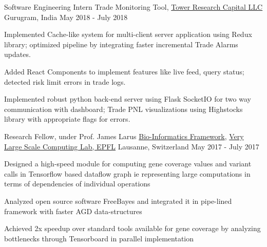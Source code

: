 

\begin{cventries}

  \cventry
    {Software Engineering Intern} %
    {Trade Monitoring Tool, \href{https://www.tower-research.com/}{Tower Research Capital LLC}} %
    {Gurugram, India} %
    {May 2018 - July 2018} %
    {
      \begin{cvitems} %
        \item {Implemented Cache-like system for multi-client server application using Redux library; optimized pipeline by integrating faster incremental Trade Alarms updates.}
        \item {Added React Components to implement features like live feed, query status; detected risk limit errors in trade logs.}
        \item {Implemented robust python back-end server using Flask SocketIO for two way communication with dashboard; Trade PNL visualizations using Highstocks library with appropriate flags for errors.}
      \end{cvitems}
    }

  \cventry
    {Research Fellow, under Prof. James Larus } %
    {\href{https://github.com/epfl-vlsc/persona}{Bio-Informatics Framework}, \href {https://vlsc.epfl.ch/} {Very Large Scale Computing Lab, EPFL}} %
    {Lausanne, Switzerland} %
    {May 2017 - July 2017} %
    {
      \begin{cvitems} %
        \item {Designed a high-speed module for computing gene coverage values and variant calls in Tensorflow based dataflow graph ie representing large computations in terms of dependencies of individual operations}
        \item {Analyzed open source software FreeBayes and integrated it in pipe-lined framework with faster AGD data-structures}
        \item {Achieved 2x speedup over standard tools available for gene coverage by analyzing bottlenecks through Tensorboard in parallel implementation}
      \end{cvitems}
    }

\end{cventries}
